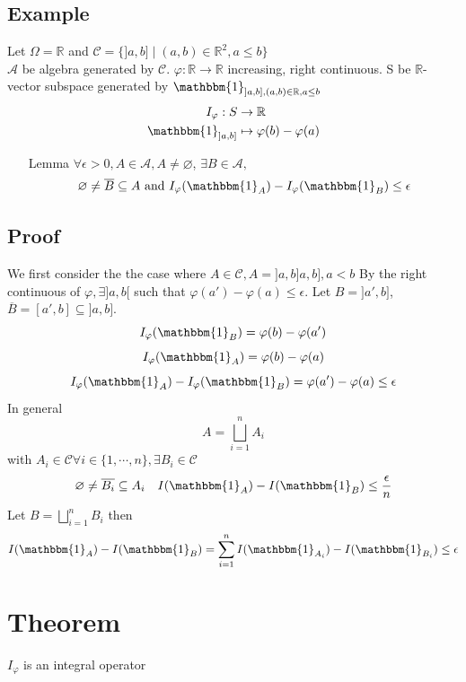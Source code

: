 \documentclass{book}
\newcommand{\leftbracket}{[}
\newcommand{\rightbracket}{]}
\begin{document}
\subsection{Example}
Let $\Omega=\mathbb{R}$ and $\mathcal{C}=\{\rightbracket a,b\rightbracket\mid (a,b)\in \mathbb{R}^2,a\leq b\}$\\
$\mathcal{A}$ be algebra generated by $\mathcal{C}$. $\varphi:\mathbb{R}\rightarrow \mathbb{R}$ increasing, right continuous. S be $\mathbb{R}$-vector subspace generated by $\mathbbm{1}_{\rightbracket a,b\rightbracket,(a,b)\in \mathbb{R},a\leq b}$
$$
\begin{aligned}
    I_\varphi: S &\rightarrow\mathbb{R}\\
    \mathbbm{1}_{\rightbracket a,b\rightbracket} &\mapsto \varphi(b)-\varphi(a)
\end{aligned}
$$
\begin{itemize}
    \item [Lemma]$\forall\epsilon>0,A\in \mathcal{A},A\neq\varnothing$, $\exists B\in \mathcal{A},$$$\varnothing\neq\overline{B}\subseteq A\text{ and } I_\varphi(\mathbbm{1}_A)-I_\varphi(\mathbbm{1}_B)\leq\epsilon$$
\end{itemize}
\subsection*{Proof} 
We first consider the the case where $A\in \mathcal{C},A=\rightbracket a,b\rightbracket a,b\rightbracket, a<b$ By the right continuous of $\varphi,\exists\rightbracket a,b\leftbracket$ such that $\varphi(a')-\varphi(a)\leq\epsilon$. Let $B=\rightbracket a',b\rightbracket$, $\overline{B}=[a',b]\subseteq\rightbracket a,b\rightbracket$.
$$I_\varphi(\mathbbm{1}_B)=\varphi(b)-\varphi(a')$$
$$I_\varphi(\mathbbm{1}_A)=\varphi(b)-\varphi(a)$$
$$I_\varphi(\mathbbm{1}_A)-I_\varphi(\mathbbm{1}_B)=\varphi(a')-\varphi(a)\leq\epsilon$$
In general $$A=\bigsqcup\limits_{i=1}^n A_i$$ with $A_i\in \mathcal{C} \forall i\in \{1,\cdots,n\},\exists B_i\in \mathcal{C}$$$\varnothing\neq\overline{B_i}\subseteq A_i\quad I(\mathbbm{1}_A)-I(\mathbbm{1}_B)\leq\frac{\epsilon}{n}$$
Let $B=\bigsqcup\limits_{i=1}^n B_i$ then $$I(\mathbbm{1}_A)-I(\mathbbm{1}_B)=\sum\limits_{i=1}^nI(\mathbbm{1}_{A_i})-I(\mathbbm{1}_{B_i})\leq\epsilon$$
\section{Theorem}
$I_\varphi$ is an integral operator
\end{document}
